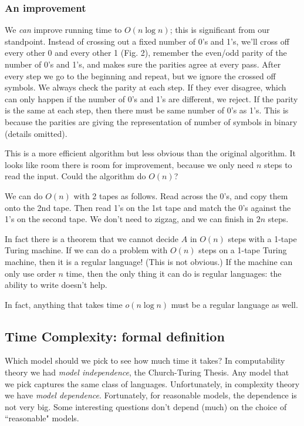 \subsubsection{An improvement}
We {\it can} improve running time to $O(n\log n)$; this is significant from our standpoint. 
Instead of crossing out a fixed number of 0's and 1's, we'll cross off every other 0 and every other 1 (Fig. 2), remember the even/odd parity of the number of 0's and 1's, and makes sure the parities agree at every pass. 
After every step we go to the beginning and repeat, but we ignore the crossed off symbols. We always check the parity at each step. If they ever disagree, which can only happen if the number of 0's and 1's are different, we reject. If the parity is the same at each step, then there must be same number of 0's as 1's. 
This is because the parities are giving the representation of number of symbols in binary (details omitted). %

This is a more efficient algorithm but less obvious than the original algorithm. It looks like room there is room for improvement, because we only need $n$ steps to read the input. Could the algorithm do $O(n)$?

We can do $O(n)$ with 2 tapes as follows. Read across the 0's, and copy them onto the 2nd tape. Then read 1's on the 1st tape and match the 0's against the 1's on the second tape. We don't need to zigzag, and we can finish in $2n$ steps.

In fact there is a theorem that we cannot decide $A$ in $O(n)$ steps with a 1-tape Turing machine. If we can do a problem with $O(n)$ steps on a 1-tape Turing machine, then it is a regular language! (This is not obvious.) If the machine can only use order $n$ time, then the only thing it can do is regular languages: the ability to write doesn't help. %

In fact, anything that takes time $o(n\log n)$ %
must be a regular language as well. 

\subsection{Time Complexity: formal definition}
Which model should we pick to see how much time it takes?
In computability theory we had {\it model independence}, the Church-Turing Thesis. Any model that we pick captures the same class of languages.
Unfortunately, in complexity theory we have {\it model dependence}. Fortunately, for reasonable models, the dependence is not very big. Some interesting questions don't depend (much) on the choice of ``reasonable"  models.

